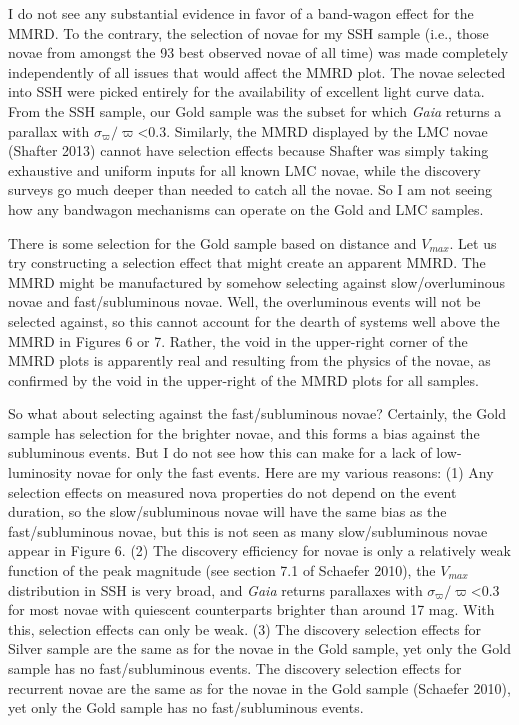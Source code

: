 \documentclass[a4paper,fleqn,usenatbib]{mnras}
\begin{document}
I do not see any substantial evidence in favor of a band-wagon effect for the MMRD.  To the contrary, the selection of novae for my SSH sample (i.e., those novae from amongst the 93 best observed novae of all time) was made completely independently of all issues that would affect the MMRD plot.  The novae selected into SSH were picked entirely for the availability of excellent light curve data.  From the SSH sample, our Gold sample was the subset for which {\it Gaia} returns a parallax with $\sigma_{\varpi}/\varpi$<0.3.  Similarly, the MMRD displayed by the LMC novae (Shafter 2013) cannot have selection effects because Shafter was simply taking exhaustive and uniform inputs for all known LMC novae, while the discovery surveys go much deeper than needed to catch all the novae.  So I am not seeing how any bandwagon mechanisms can operate on the Gold and LMC samples.

There is some selection for the Gold sample based on distance and $V_{max}$.  Let us try constructing a selection effect that might create an apparent MMRD.  The MMRD might be manufactured by somehow selecting against slow/overluminous novae and fast/subluminous novae.  Well, the overluminous events will not be selected against, so this cannot account for the dearth of systems well above the MMRD in Figures 6 or 7.  Rather, the void in the upper-right corner of the MMRD plots is apparently real and resulting from the physics of the novae, as confirmed by the void in the upper-right of the MMRD plots for all samples.

So what about selecting against the fast/subluminous novae?  Certainly, the Gold sample has selection for the brighter novae, and this forms a bias against the subluminous events.  But I do not see how this can make for a lack of low-luminosity novae for only the fast events.  Here are my various reasons:  (1) Any selection effects on measured nova properties do not depend on the event duration, so the slow/subluminous novae will have the same bias as the fast/subluminous novae, but this is not seen as many slow/subluminous novae appear in Figure 6.  (2) The discovery efficiency for novae is only a relatively weak function of the peak magnitude (see section 7.1 of Schaefer 2010), the $V_{max}$ distribution in SSH is very broad, and {\it Gaia} returns parallaxes with $\sigma_{\varpi}/\varpi$<0.3 for most novae with quiescent counterparts brighter than around 17 mag.  With this, selection effects can only be weak.  (3) The discovery selection  effects for Silver sample are the same as for the novae in the Gold sample, yet only the Gold sample has no fast/subluminous events.  The discovery selection  effects for recurrent novae are the same as for the novae in the Gold sample (Schaefer 2010), yet only the Gold sample has no fast/subluminous events.  
\end{document}
